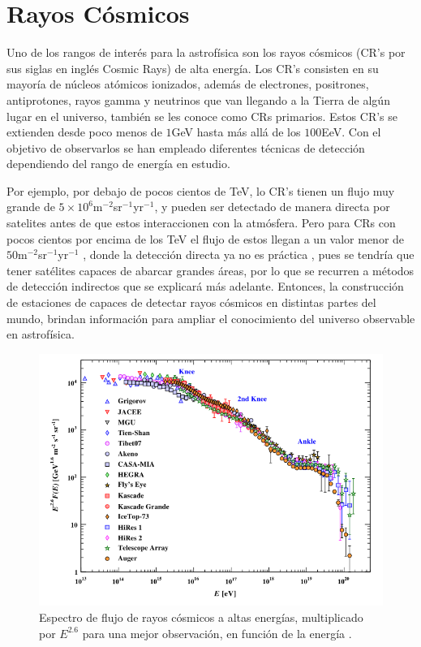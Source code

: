 \chapter{Rayos Cósmicos}\label{RAYOS_COSMICOS}
Uno de los rangos de interés para la astrofísica son los rayos cósmicos (CR's por sus siglas en inglés Cosmic Rays) de alta energía. Los CR's consisten en su mayoría de núcleos atómicos ionizados, además de electrones, positrones, antiprotones, rayos gamma y neutrinos que van llegando a la Tierra de algún lugar en el universo, también se les conoce como CRs primarios. Estos CR's se extienden desde poco menos de $1$GeV hasta más allá de los $100$EeV. Con el objetivo de observarlos se han empleado diferentes técnicas de detección dependiendo del rango de energía en estudio.

Por ejemplo, por debajo de pocos cientos de TeV, lo CR's tienen un flujo muy grande de $5\times 10^6$m$^{-2}$sr$^{-1}$yr$^{-1}$, y pueden ser detectado de manera directa por satelites antes de que estos interaccionen con la atmósfera. Pero para CRs con pocos cientos por encima de los TeV el flujo de estos llegan a un valor menor de $50$m$^{-2}$sr$^{-1}$yr$^{-1}$ \cite{MOLLERACH201885}, donde la detección directa ya no es práctica , pues se tendría que tener satélites capaces de abarcar grandes áreas, por lo que se recurren a métodos de detección indirectos que se explicará más adelante. Entonces, la construcción de estaciones de capaces de detectar rayos cósmicos en distintas partes del mundo, brindan información para ampliar el conocimiento del universo observable en astrofísica.

\begin{figure}
	\centering
	\includegraphics[scale = 0.5]{FIGURAS/ESPECTRO_RC.png}
	\caption{Espectro de flujo de rayos cósmicos a altas energías, multiplicado por $E^{2.6}$ para una mejor observación, en función de la energía \cite{MOLLERACH201885}.}
	\label{Espectro_CR}
\end{figure}

